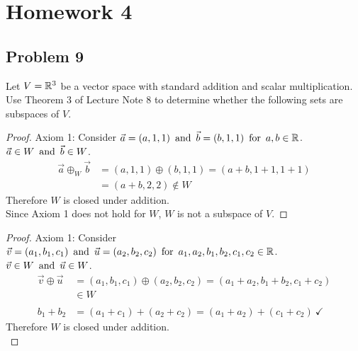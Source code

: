 





\section*{Homework 4}

\subsection*{Problem 9}
Let $V = \mathbb{R}^3$ be a vector space with standard addition and scalar multiplication. Use Theorem 3 of Lecture Note 8 to determine whether the following sets are subspaces of $V$.
\begin{enumerate}
  \begin{proof}
    Axiom 1: Consider $\vec{a} = (a,1,1) \operatorname{~\text{and}~} \vec{b} = (b,1,1) \operatorname{~\text{for}~} a,b \in \mathbb{R}$. $\vec{a} \in W \operatorname{~\text{and}~} \vec{b} \in W$.
    \begin{align*}
      \vec{a} \oplus_W \vec{b} & = (a,1,1) \oplus (b,1,1) = (a+b,1+1,1+1) \\
                               & = (a+b,2,2) \not \in W
    \end{align*}
    Therefore $W$ is  closed under addition. \\
    Since Axiom 1 does not hold for $W$, $W$ is not a subspace of $V$.
  \end{proof}
  \begin{proof}
    Axiom 1: Consider $\vec{v} = (a_1,b_1,c_1) \operatorname{~\text{and}~} \vec{u} = (a_2,b_2,c_2) \operatorname{~\text{for}~} a_1,a_2,b_1,b_2,c_1,c_2 \in \mathbb{R}$. \\
    $\vec{v} \in W \operatorname{~\text{and}~} \vec{u} \in W$.
    \begin{align*}
      \vec{v} \oplus \vec{u} & = (a_1,b_1,c_1) \oplus (a_2,b_2,c_2) = (a_1+a_2,b_1+b_2,c_1+c_2)   \\
                             & \in W                                                              \\ \\
      b_1 + b_2              & = (a_1 + c_1) + (a_2 + c_2) = (a_1 + a_2) + (c_1 + c_2)~\checkmark
    \end{align*}
    Therefore $W$ is closed under addition. \\

\end{proof}
\end{enumerate}
